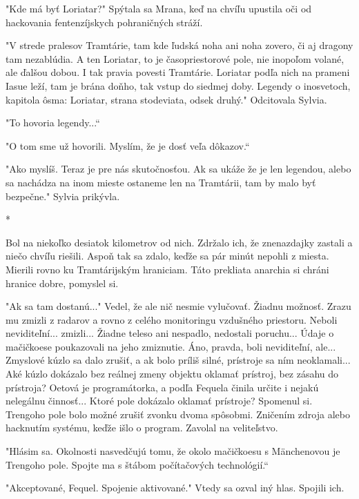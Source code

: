 \documentclass{book}
\begin{document}
"$ $Kde má byť Loriatar?"$ $ Spýtala sa Mrana, keď na chvíľu upustila oči od hackovania fentenzíjskych pohraničných stráží.

"$ $V strede pralesov Tramtárie, tam kde ľudská noha ani noha zovero, či aj dragony tam nezablúdia. A ten Loriatar, to je časopriestorové pole, nie inopoľom volané, ale ďalšou dobou. I tak pravia povesti Tramtárie. Loriatar podľa nich na prameni Iasue leží, tam je brána doňho, tak vstup do siedmej doby. Legendy o inosvetoch, kapitola ôsma: Loriatar, strana stodeviata, odsek druhý."$ $ Odcitovala Sylvia.

"$ $To hovoria legendy...“

"$ $O tom sme už hovorili. Myslím, že je dosť veľa dôkazov.“

"$ $Ako myslíš. Teraz je pre nás skutočnosťou. Ak sa ukáže že je len legendou, alebo sa nachádza na inom mieste ostaneme len na Tramtárii, tam by malo byť bezpečne."$ $ Sylvia prikývla.

\begin{center}

*

\end{center}

Bol na niekoľko desiatok kilometrov od nich. Zdržalo ich, že znenazdajky zastali a niečo chvíľu riešili. Aspoň tak sa zdalo, keďže sa pár minút nepohli z miesta. Mierili rovno ku Tramtárijským hraniciam. Táto prekliata anarchia si chráni hranice dobre, pomyslel si.

"$ $Ak sa tam dostanú..."$ $ Vedel, že ale nič nesmie vylučovať. Žiadnu možnosť. Zrazu mu zmizli z radarov a rovno z celého monitoringu vzdušného priestoru. Neboli neviditeľní... zmizli... Žiadne teleso ani nespadlo, nedostali poruchu... Údaje o mačičkoese poukazovali na jeho zmiznutie. Áno, pravda, boli neviditeľní, ale... Zmyslové kúzlo sa dalo zrušiť, a ak bolo príliš silné, prístroje sa ním neoklamali... Aké kúzlo dokázalo bez reálnej zmeny objektu oklamať prístroj, bez zásahu do prístroja? Oetová je programátorka, a podľa Fequela činila určite i nejakú nelegálnu činnosť... Ktoré pole dokázalo oklamať prístroje? Spomenul si. Trengoho pole bolo možné zrušiť zvonku dvoma spôsobmi. Zničením zdroja alebo hacknutím systému, keďže išlo o program. Zavolal na veliteľstvo.

"$ $Hlásim sa. Okolnosti nasvedčujú tomu, že okolo mačičkoesu s Mänchenovou je Trengoho pole. Spojte ma s štábom počítačových technológií.“

"$ $Akceptované, Fequel. Spojenie aktivované."$ $ Vtedy sa ozval iný hlas. Spojili ich.
\end{document}
